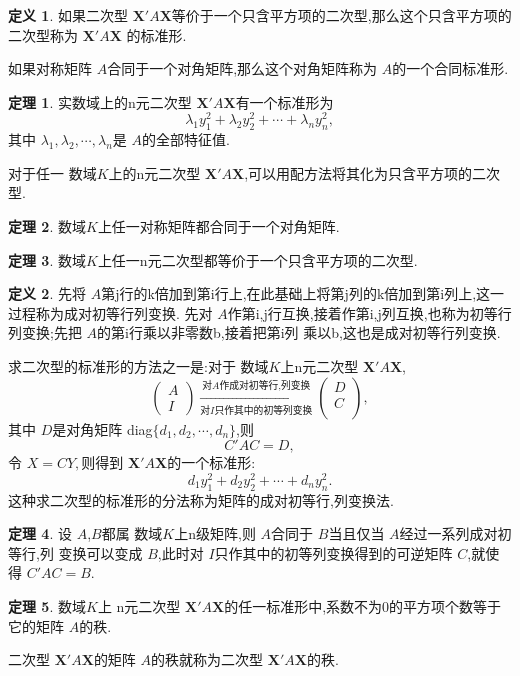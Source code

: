\documentclass[a4paper,11pt]{article}%
\theoremstyle{remark}
\theoremstyle{definition}
\newtheorem{theorem}{定理}[section]
\theoremstyle{definition}
\newtheorem*{definition}{定义}
\theoremstyle{plain}
\begin{document}
\begin{definition}
    如果二次型 $\mathbf{X}'A\mathbf{X}$等价于一个只含平方项的二次型,那么这个只含平方项的二次型称为 $\mathbf{X}'A\mathbf{X}$
    的标准形.

    如果对称矩阵 $A$合同于一个对角矩阵,那么这个对角矩阵称为 $A$的一个合同标准形.
\end{definition}
\begin{theorem}
    实数域上的n元二次型 $\mathbf{X}'A\mathbf{X}$有一个标准形为
\[\lambda_1y^2_1+\lambda_2y^2_2+\cdots+\lambda_ny^2_n,\]
其中 $\lambda_1,\lambda_2,\cdots,\lambda_n$是 $A$的全部特征值.
\end{theorem}
对于任一 数域$K$上的n元二次型 $\mathbf{X}'A\mathbf{X}$,可以用配方法将其化为只含平方项的二次型.
\begin{theorem}
    数域$K$上任一对称矩阵都合同于一个对角矩阵.
\end{theorem}
\begin{theorem}
    数域$K$上任一n元二次型都等价于一个只含平方项的二次型.
\end{theorem}
\begin{definition}
    先将 $A$第j行的k倍加到第i行上,在此基础上将第j列的k倍加到第i列上,这一过程称为成对初等行列变换.
    先对 $A$作第i,j行互换,接着作第i,j列互换,也称为初等行列变换;先把 $A$的第i行乘以非零数b,接着把第i列
    乘以b,这也是成对初等行列变换.
\end{definition}
求二次型的标准形的方法之一是:对于 数域$K$上n元二次型 $\mathbf{X}'A\mathbf{X}$,
\[\begin{pmatrix}
    A\\
    I
\end{pmatrix}
\xrightarrow[\text{对}I\text{只作其中的初等列变换}]{\text{对}A\text{作成对初等行,列变换}}
\begin{pmatrix}
    D\\
    C\\
\end{pmatrix},\]
其中 $D$是对角矩阵 diag$\{d_1,d_2,\cdots,d_n\}$,则
\[C'AC=D,\]
令 $X=CY,$则得到 $\mathbf{X}'A\mathbf{X}$的一个标准形:
\[d_1y^2_1+d_2y^2_2+\cdots+d_ny^2_n.\]
这种求二次型的标准形的分法称为矩阵的成对初等行,列变换法.
\begin{theorem}
    设 $A$,$B$都属 数域$K$上n级矩阵,则 $A$合同于 $B$当且仅当 $A$经过一系列成对初等行,列
    变换可以变成 $B$,此时对 $I$只作其中的初等列变换得到的可逆矩阵 $C$,就使得 $C'AC=B$.
\end{theorem}
\begin{theorem}
    数域$K$上 n元二次型 $\mathbf{X}'A\mathbf{X}$的任一标准形中,系数不为0的平方项个数等于
    它的矩阵 $A$的秩.
\end{theorem}
二次型 $\mathbf{X}'A\mathbf{X}$的矩阵 $A$的秩就称为二次型 $\mathbf{X}'A\mathbf{X}$的秩.
\end{document}
